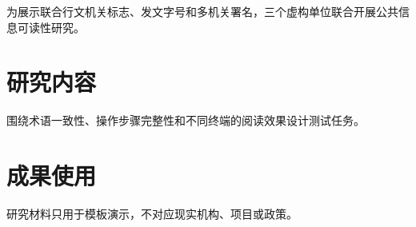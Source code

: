 \documentclass{sysuredhead}
\begin{document}
\RedHeadMakeHead

为展示联合行文机关标志、发文字号和多机关署名，三个虚构单位联合开展公共信息可读性研究。

\section{研究内容}

围绕术语一致性、操作步骤完整性和不同终端的阅读效果设计测试任务。

\section{成果使用}

研究材料只用于模板演示，不对应现实机构、项目或政策。

\RedHeadMakeClosing
\RedHeadMakeImprint
\end{document}
